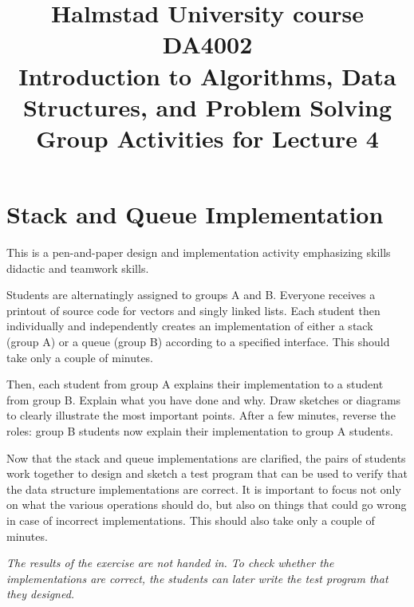 \documentclass[a4paper]{article}
\begin{document}
\title{
  {\small
    Halmstad University course DA4002\\
    Introduction to Algorithms, Data Structures, and Problem Solving\\
  }
  Group Activities for Lecture 4
}
\maketitle

\section{Stack and Queue Implementation}

This is a pen-and-paper design and implementation activity emphasizing skills didactic and teamwork skills.

Students are alternatingly assigned to groups A and B.
Everyone receives a printout of source code for vectors and singly linked lists.
Each student then individually and independently creates an implementation of either a stack (group A) or a queue (group B) according to a specified interface.
This should take only a couple of minutes.

Then, each student from group A explains their implementation to a student from group B.
Explain what you have done and why.
Draw sketches or diagrams to clearly illustrate the most important points.
After a few minutes, reverse the roles:
group B students now explain their implementation to group A students.

Now that the stack and queue implementations are clarified, the pairs of students work together to design and sketch a test program that can be used to verify that the data structure implementations are correct.
It is important to focus not only on what the various operations should do, but also on things that could go wrong in case of incorrect implementations.
This should also take only a couple of minutes.

\emph{The results of the exercise are not handed in.
  To check whether the implementations are correct, the students can later write the test program that they designed.}
\end{document}
